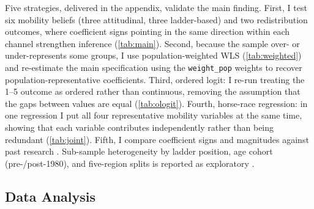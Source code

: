 \documentclass[11pt,a4paper]{article}
\begin{document}
Five strategies, delivered in the appendix, validate the main finding. First, I test six mobility beliefs (three attitudinal,
three ladder-based) and two redistribution outcomes, where coefficient signs pointing
in the same direction within each channel strengthen inference (\cref{tab:main}).
Second, because the sample over- or under-represents some groups, I use
population-weighted WLS (\cref{tab:weighted}) and re-estimate the main specification
using the \texttt{weight\_pop} weights to recover population-representative
coefficients. Third, ordered logit: I re-run treating the 1--5 outcome as ordered
rather than continuous, removing the assumption that the gaps between values are
equal (\cref{tab:ologit}). Fourth, horse-race regression: in one regression I put all
four representative mobility variables at the same time, showing that each variable
contributes independently rather than being redundant (\cref{tab:joint}). Fifth, I compare coefficient signs and magnitudes against past research \citep{alesina2005preferences, ravallion2000wants,
cojocaru2014prospects, alesina2018intergenerational}. Sub-sample heterogeneity by
ladder position, age cohort (pre-/post-1980), and five-region splits is reported as
exploratory \citep{alesina2007goodbye, giuliano2014growing}.


\subsection{Data Analysis}
\end{document}
